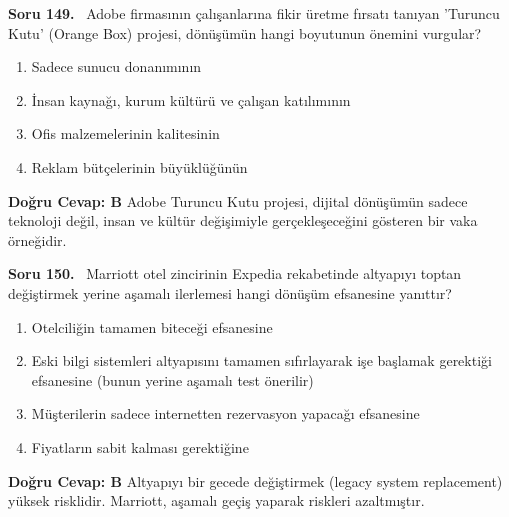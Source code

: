 \documentclass[11pt,a4paper,openany]{book}
\begin{document}
\needspace{5cm}
\vspace{8pt}
\noindent\textbf{\large\sffamily Soru 149.} \ Adobe firmasının çalışanlarına fikir üretme fırsatı tanıyan 'Turuncu Kutu' (Orange Box) projesi, dönüşümün hangi boyutunun önemini vurgular?
\begin{enumerate}[label=\Alph*), leftmargin=25pt, topsep=4pt, itemsep=2pt]
    \item Sadece sunucu donanımının
    \item İnsan kaynağı, kurum kültürü ve çalışan katılımının
    \item Ofis malzemelerinin kalitesinin
    \item Reklam bütçelerinin büyüklüğünün
\end{enumerate}
\vspace{4pt}
\begin{tcolorbox}[title=Cevap ve Açıklama, colback=gray!3!white, colframe=primarycolor!90!black, arc=2mm, fonttitle=\bfseries\sffamily, top=6pt, bottom=6pt]
    \textbf{Doğru Cevap: B}
    \vspace{2pt}
    Adobe Turuncu Kutu projesi, dijital dönüşümün sadece teknoloji değil, insan ve kültür değişimiyle gerçekleşeceğini gösteren bir vaka örneğidir.
\end{tcolorbox}
\vspace{10pt}

\needspace{5cm}
\vspace{8pt}
\noindent\textbf{\large\sffamily Soru 150.} \ Marriott otel zincirinin Expedia rekabetinde altyapıyı toptan değiştirmek yerine aşamalı ilerlemesi hangi dönüşüm efsanesine yanıttır?
\begin{enumerate}[label=\Alph*), leftmargin=25pt, topsep=4pt, itemsep=2pt]
    \item Otelciliğin tamamen biteceği efsanesine
    \item Eski bilgi sistemleri altyapısını tamamen sıfırlayarak işe başlamak gerektiği efsanesine (bunun yerine aşamalı test önerilir)
    \item Müşterilerin sadece internetten rezervasyon yapacağı efsanesine
    \item Fiyatların sabit kalması gerektiğine
\end{enumerate}
\vspace{4pt}
\begin{tcolorbox}[title=Cevap ve Açıklama, colback=gray!3!white, colframe=primarycolor!90!black, arc=2mm, fonttitle=\bfseries\sffamily, top=6pt, bottom=6pt]
    \textbf{Doğru Cevap: B}
    \vspace{2pt}
    Altyapıyı bir gecede değiştirmek (legacy system replacement) yüksek risklidir. Marriott, aşamalı geçiş yaparak riskleri azaltmıştır.
\end{tcolorbox}
\vspace{10pt}
\end{document}

